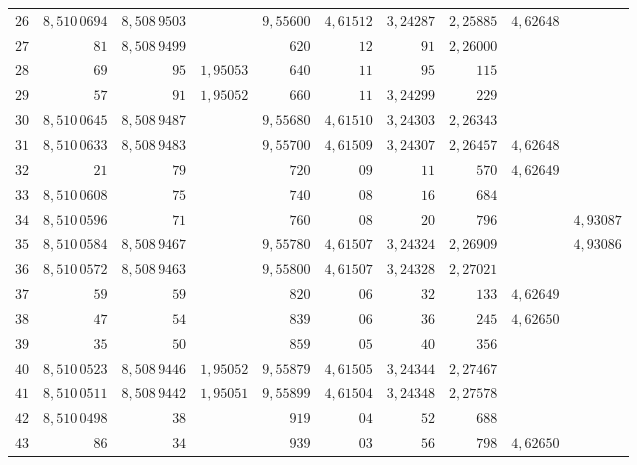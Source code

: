 \begin{center}
\begin{tabular}{r|r|r|r|r|r|r|r|r|r}
\hline
\(26\) & \(8{,}510\,0694\) & \(8{,}508\,9503\) &  & \(9{,}55600\) & \(4{,}61512\) & \(3{,}24287\) & \(2{,}25885\) & \(4{,}62648\) &  \\
\(27\) & \(81\) & \(8{,}508\,9499\) &  & \(620\) & \(12\) & \(91\) & \(2{,}26000\) &  &  \\
\(28\) & \(69\) & \(95\) & \(1{,}95053\) & \(640\) & \(11\) & \(95\) & \(115\) &  &  \\
\(29\) & \(57\) & \(91\) & \(1{,}95052\) & \(660\) & \(11\) & \(3{,}24299\) & \(229\) &  &  \\
\(30\) & \(8{,}510\,0645\) & \(8{,}508\,9487\) &  & \(9{,}55680\) & \(4{,}61510\) & \(3{,}24303\) & \(2{,}26343\) &  &  \\
\hline
\(31\) & \(8{,}510\,0633\) & \(8{,}508\,9483\) &  & \(9{,}55700\) & \(4{,}61509\) & \(3{,}24307\) & \(2{,}26457\) & \(4{,}62648\) &  \\
\(32\) & \(21\) & \(79\) &  & \(720\) & \(09\) & \(11\) & \(570\) & \(4{,}62649\) &  \\
\(33\) & \(8{,}510\,0608\) & \(75\) &  & \(740\) & \(08\) & \(16\) & \(684\) &  &  \\
\(34\) & \(8{,}510\,0596\) & \(71\) &  & \(760\) & \(08\) & \(20\) & \(796\) &  & \(4{,}93087\) \\
\(35\) & \(8{,}510\,0584\) & \(8{,}508\,9467\) &  & \(9{,}55780\) & \(4{,}61507\) & \(3{,}24324\) & \(2{,}26909\) &  & \(4{,}93086\) \\
\hline
\(36\) & \(8{,}510\,0572\) & \(8{,}508\,9463\) &  & \(9{,}55800\) & \(4{,}61507\) & \(3{,}24328\) & \(2{,}27021\) &  &  \\
\(37\) & \(59\) & \(59\) &  & \(820\) & \(06\) & \(32\) & \(133\) & \(4{,}62649\) &  \\
\(38\) & \(47\) & \(54\) &  & \(839\) & \(06\) & \(36\) & \(245\) & \(4{,}62650\) &  \\
\(39\) & \(35\) & \(50\) &  & \(859\) & \(05\) & \(40\) & \(356\) &  &  \\
\(40\) & \(8{,}510\,0523\) & \(8{,}508\,9446\) & \(1{,}95052\) & \(9{,}55879\) & \(4{,}61505\) & \(3{,}24344\) & \(2{,}27467\) &  &  \\
\hline
\(41\) & \(8{,}510\,0511\) & \(8{,}508\,9442\) & \(1{,}95051\) & \(9{,}55899\) & \(4{,}61504\) & \(3{,}24348\) & \(2{,}27578\) &  &  \\
\(42\) & \(8{,}510\,0498\) & \(38\) &  & \(919\) & \(04\) & \(52\) & \(688\) &  &  \\
\(43\) & \(86\) & \(34\) &  & \(939\) & \(03\) & \(56\) & \(798\) & \(4{,}62650\) &  \\

\end{tabular}
\end{center}
